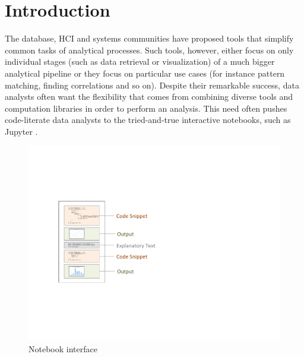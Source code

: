 \vspace*{-0.4cm}
\section{Introduction}
\label{section:introduction}




The database, HCI and systems communities have proposed tools that simplify common tasks of analytical processes. Such tools, however, either focus on only individual stages (such as data retrieval or visualization) of a much bigger analytical pipeline or they focus on particular use cases (for instance pattern matching, finding correlations and so on). Despite their remarkable success, data analysts often want the flexibility that comes from combining diverse tools and computation libraries in order to perform an analysis. This need often pushes code-literate data analysts to the tried-and-true interactive notebooks, such as Jupyter \cite{Jupyter}.


\begin{figure}[t]
  \centering
  \includegraphics[width=0.7\columnwidth]{figures/notebook2.pdf}
  \caption{Notebook interface}
  \vspace{-15pt}
\label{figure:notebook-interface}
\end{figure}

